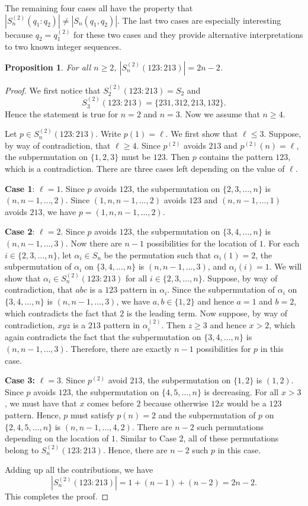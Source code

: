 \documentclass[10pt,a4paper]{amsart}
\newtheorem{proposition}[theorem]{Proposition}
\numberwithin{equation}{section}
\begin{document}
The remaining four cases all have the property that $|S_n^{(2)}(q_1:q_2)|\neq|S_n(q_1,q_2)|$. The last two cases are especially interesting because $q_2=q_1^{(2)}$ for these two cases and they provide alternative 
interpretations to two known integer sequences.
\begin{proposition}\label{Prop:123;213}
For all $n\geq2$, $|S_n^{(2)}(123:213)|=2n-2$.
\end{proposition}
\begin{proof}
We first notice that $S_2^{(2)}(123:213)=S_2$ and
\[
S_3^{(2)}(123:213)=\{231,312,213,132\}.
\]
Hence the statement is true for $n=2$ and $n=3$. Now we assume that $n\geq4$.


    Let $p\in S_n^{(2)}(123:213)$. Write $p(1)=\ell$. We first show that $\ell\leq 3$. Suppose, by way of contradiction, that $\ell\geq4$. Since $p^{(2)}$ avoids $213$ and $p^{(2)}(n)=\ell$, the subpermutation on $\{1,2,3\}$ must be $123$. Then $p$ contains the pattern $123$, which is a contradiction. There are three cases left depending on the value of $\ell$.

    \textbf{Case 1}: $\ell=1$. Since $p$ avoids $123$, the subpermutation on $\{2,3,\ldots,n\}$ is $(n,n-1,\ldots,2)$. Since $(1,n,n-1,\ldots,2)$ avoids $123$ and $(n,n-1,\ldots,1)$ avoids $213$, we have $p=(1,n,n-1,\ldots,2)$.

    \textbf{Case 2}: $\ell=2$. Since $p$ avoids $123$, the subpermutation on $\{3,4,\ldots,n\}$ is $(n,n-1,\ldots,3)$. Now there are $n-1$ possibilities for the location of $1$. For each $i\in\{2,3,\ldots,n\}$, let $\alpha_i\in S_n$ be the permutation such that $\alpha_i(1)=2$, the subpermutation of $\alpha_i$ on $\{3,4,\ldots,n\}$ is $(n,n-1,\ldots,3)$, and $\alpha_i(i)=1$. We will show that $\alpha_i\in S_n^{(2)}(123:213)$ for all $i\in\{2,3,\ldots,n\}$. 
Suppose, by way of contradiction, that $abc$ is a $123$ pattern in $\alpha_i$. Since the subpermutation of $\alpha_i$ on $\{3,4,\ldots,n\}$ is $(n,n-1,\ldots,3)$, we have $a,b\in\{1,2\}$ and hence $a=1$ and $b=2$, which contradicts the fact that $2$ is the leading term. Now suppose, by way of contradiction, $xyz$ is a $213$ pattern in $\alpha_i^{(2)}$. Then $z\geq3$ and hence $x>2$, which again contradicts the fact that the subpermutation on $\{3,4,\ldots,n\}$ is $(n,n-1,\ldots,3)$. Therefore, there are exactly $n-1$ possibilities for $p$ in this case.
    
    \textbf{Case 3:} $\ell=3$. Since $p^{(2)}$ avoid $213$, the subpermutation on $\{1,2\}$ is $(1,2)$. Since $p$ avoids $123$, the subpermutation on $\{4,5,\ldots,n\}$ is decreasing. For all $x>3$, we must have that $x$ comes before $2$ because otherwise $12x$ would be a $123$ pattern. Hence, $p$ must satisfy $p(n)=2$ and the subpermutation of $p$ on $\{2,4,5,\ldots,n\}$ is $(n,n-1,\ldots,4,2)$. There are $n-2$ such permutations depending on the location of $1$. Similar to Case 2, 
all of these permutations belong to $S_n^{(2)}(123:213)$. Hence, there are $n-2$ such $p$ in this case.

    Adding up all the contributions, we have 
    \[
    |S_n^{(2)}(123:213)|=1+(n-1)+(n-2)=2n-2.
    \]
    This completes the proof.
\end{proof}
\end{document}
